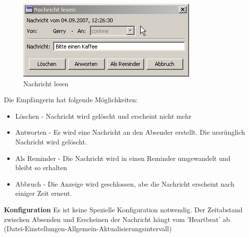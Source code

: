 \documentclass[a4paper]{scrartcl}
\begin{document}
\begin{figure}[htp]
    \includegraphics{newmsg3}
    \caption{Nachricht lesen}
\end{figure}

Die Empfängerin hat folgende Möglichkeiten:
\begin{itemize}
\item Löschen - Nachricht wird gelöscht und erscheint nicht mehr
\item Antworten - Es wird eine Nachricht an den Absender erstellt. Die ursrünglich Nachricht wird gelöscht.
\item Als Reminder - Die Nachricht wird in einen Reminder umgewandelt und bleibt so erhalten
\item Abbruch - Die Anzeige wird geschlossen, abe die Nachricht erscheint nach einiger Zeit erneut.
\end{itemize}

\bigskip

\textbf{Konfiguration}
Es ist keine Spezielle Konfiguration notwendig. Der Zeitabstand zwischen Absenden und Erscheinen der Nachricht hängt vom 'Heartbeat' ab (Datei-Einstellungen-Allgemein-Aktualisierungsintervall)
\end{document}
